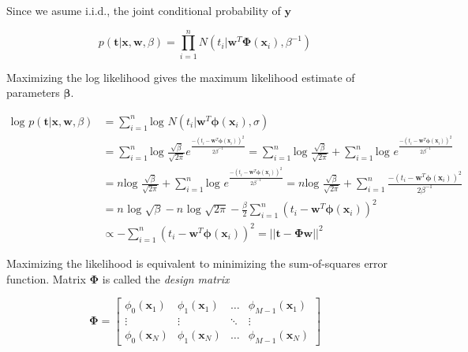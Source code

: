 \documentclass[a4paper,10pt]{article}
\begin{document}
Since we asume i.i.d., the joint conditional probability of $\bm{y}$

\begin{equation}
p(\bm{t} | \bm{x}, \bm{w}, \beta) = \prod_{i=1}^n N(t_i | \bm{w}^T \bm{\Phi}(\bm{x}_i) , \beta^{-1})
\end{equation}


Maximizing the log likelihood gives the maximum likelihood estimate of parameters $\bm{\beta}$.

\begin{equation}\label{eq:maximum_likelihood}
 \begin{split}
   \text{log } p(\bm{t} | \bm{x}, \bm{w}, \beta) & = \sum_{i=1}^{n} \text{log } N(t_i | \bm{w}^T \bm{\phi}(\bm{x}_i), \sigma)  \\
  & =  \sum_{i=1}^{n} \text{log }  \frac{\sqrt{\beta} }{\sqrt{2\pi}} e^{\frac{-(t_i - \bm{w}^T\bm{\phi}(\bm{x}_i))^2}{2\beta^{-1}} } = \sum_{i=1}^{n} \text{log } \frac{\sqrt{\beta} }{\sqrt{2\pi}} + \sum_{i=1}^{n} \text{log } e^{\frac{-(t_i - \bm{w}^T\bm{\phi}(\bm{x}_i))^2}{2\beta^{-1}} } \\
  & = n \text{log } \frac{\sqrt{\beta} }{\sqrt{2\pi}} + \sum_{i=1}^{n} \text{log } e^{\frac{-(t_i - \bm{w}^T\bm{\phi}(\bm{x}_i))^2}{2\beta^{-1}} } = n \text{log } \frac{\sqrt{\beta} }{\sqrt{2\pi}} + \sum_{i=1}^{n}  \frac{-(t_i - \bm{w}^T\bm{\phi}(\bm{x}_i))^2}{2\beta^{-1}} \\
   &  = n \text{ log } \sqrt{\beta} - n \text{ log } \sqrt{2\pi} - \frac{\beta}{2} \sum_{i=1}^{n}  (t_i - \bm{w}^T\bm{\phi}(\bm{x}_i))^2   \\
  & \propto  - \sum_{i=1}^{n}  (t_i - \bm{w}^T\bm{\phi}(\bm{x}_i))^2 = ||\bm{t}-\bm{\Phi}\bm{w}||^2
 \end{split}
\end{equation}

Maximizing the likelihood is equivalent to minimizing the sum-of-squares error function.
Matrix $\bm{\Phi}$ is called the \emph{design matrix}

\begin{equation}
 \bm{\Phi} =
  \begin{bmatrix}
    \phi_0(\bm{x}_1) & \phi_1(\bm{x}_1) & \dots & \phi_{M-1}(\bm{x}_1)\\
    \vdots & \vdots & \ddots & \vdots \\
    \phi_0(\bm{x}_N) & \phi_1(\bm{x}_N) & \dots & \phi_{M-1}(\bm{x}_N)
  \end{bmatrix}
\end{equation}
\end{document}
